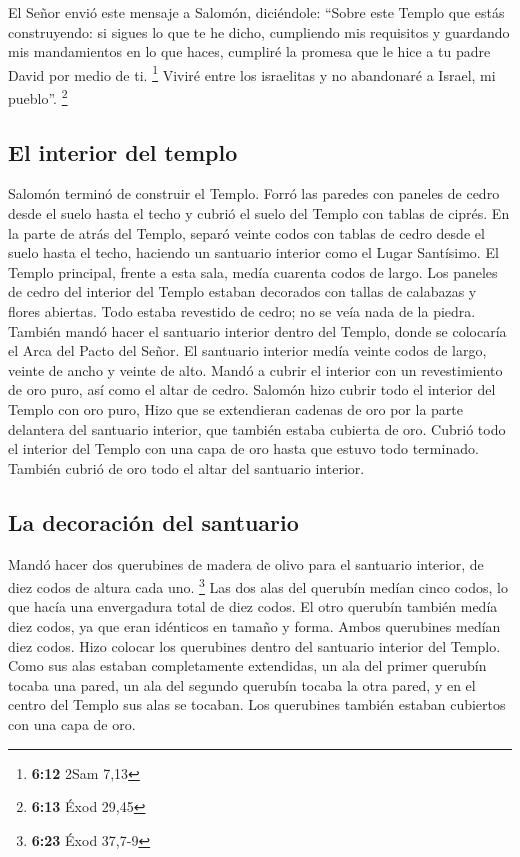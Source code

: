  El Señor envió este mensaje a Salomón, diciéndole:
 ``Sobre este Templo que estás construyendo: si sigues lo
que te he dicho, cumpliendo mis requisitos y guardando mis mandamientos
en lo que haces, cumpliré la promesa que le hice a tu padre David por
medio de ti. \footnote{\textbf{6:12} 2Sam 7,13}  Viviré
entre los israelitas y no abandonaré a Israel, mi pueblo''. \footnote{\textbf{6:13}
  Éxod 29,45}

\hypertarget{el-interior-del-templo}{%
\subsection{El interior del templo}\label{el-interior-del-templo}}

 Salomón terminó de construir el Templo. 
Forró las paredes con paneles de cedro desde el suelo hasta el techo y
cubrió el suelo del Templo con tablas de ciprés.  En la
parte de atrás del Templo, separó veinte codos con tablas de cedro desde
el suelo hasta el techo, haciendo un santuario interior como el Lugar
Santísimo.  El Templo principal, frente a esta sala,
medía cuarenta codos de largo.  Los paneles de cedro del
interior del Templo estaban decorados con tallas de calabazas y flores
abiertas. Todo estaba revestido de cedro; no se veía nada de la piedra.
 También mandó hacer el santuario interior dentro del
Templo, donde se colocaría el Arca del Pacto del Señor. 
El santuario interior medía veinte codos de largo, veinte de ancho y
veinte de alto. Mandó a cubrir el interior con un revestimiento de oro
puro, así como el altar de cedro.  Salomón hizo cubrir
todo el interior del Templo con oro puro, Hizo que se extendieran
cadenas de oro por la parte delantera del santuario interior, que
también estaba cubierta de oro.  Cubrió todo el interior
del Templo con una capa de oro hasta que estuvo todo terminado. También
cubrió de oro todo el altar del santuario interior.

\hypertarget{la-decoraciuxf3n-del-santuario}{%
\subsection{La decoración del
santuario}\label{la-decoraciuxf3n-del-santuario}}

 Mandó hacer dos querubines de madera de olivo para el
santuario interior, de diez codos de altura cada uno. \footnote{\textbf{6:23}
  Éxod 37,7-9}  Las dos alas del querubín medían cinco
codos, lo que hacía una envergadura total de diez codos. 
El otro querubín también medía diez codos, ya que eran idénticos en
tamaño y forma.  Ambos querubines medían diez codos.
 Hizo colocar los querubines dentro del santuario
interior del Templo. Como sus alas estaban completamente extendidas, un
ala del primer querubín tocaba una pared, un ala del segundo querubín
tocaba la otra pared, y en el centro del Templo sus alas se tocaban.
 Los querubines también estaban cubiertos con una capa de
oro.

